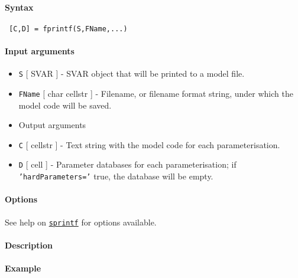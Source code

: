


	\paragraph{Syntax}
 
 \begin{verbatim}
 [C,D] = fprintf(S,FName,...)
 \end{verbatim}
 
 \paragraph{Input arguments}
 
 \begin{itemize}
 \item
   \texttt{S} {[} SVAR {]} - SVAR object that will be printed to a model
   file.
 \item
   \texttt{FName} {[} char \textbar{} cellstr {]} - Filename, or filename
   format string, under which the model code will be saved.
 \item
   Output arguments
 \item
   \texttt{C} {[} cellstr {]} - Text string with the model code for each
   parameterisation.
 \item
   \texttt{D} {[} cell {]} - Parameter databases for each
   parameterisation; if \texttt{'hardParameters='} true, the database
   will be empty.
 \end{itemize}
 
 \paragraph{Options}
 
 See help on \href{SVAR/sprintf}{\texttt{sprintf}} for options available.
 
 \paragraph{Description}
 
 \paragraph{Example}


